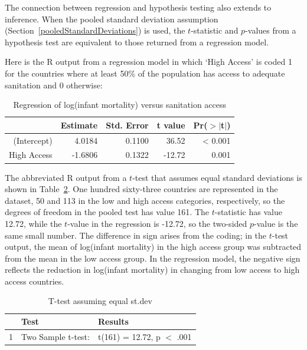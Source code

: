 The connection between regression and hypothesis testing also extends to inference. When the pooled standard deviation assumption (Section~\ref{pooledStandardDeviations}) is used, the $t$-statistic and $p$-values from a hypothesis test are equivalent to those returned from a regression model. 

Here is the \textsf{R} output from a regression model in which `High Access' is coded 1 for the countries where at least 50\% of the population has access to adequate sanitation and 0 otherwise:


\begin{table}[ht]
\centering
\begin{tabular}{rrrrr}
  \hline
 & Estimate & Std. Error & t value & Pr($>$$|$t$|$) \\ 
  \hline
(Intercept) & 4.0184 & 0.1100 & 36.52 & < 0.001 \\ 
  High Access & -1.6806 & 0.1322 & -12.72 & 0.001 \\ 
   \hline
\end{tabular}
\caption{Regression of log(infant mortality) versus sanitation access} 
\label{regressLogInfMortAccess}
\end{table}



The abbreviated \textsf{R} output from a $t$-test that assumes equal standard deviations is shown in Table~\ref{tTestSanitEqualStd}.  One hundred sixty-three countries are represented in the dataset, 50 and 113 in the low and high access categories, respectively,  so the degrees of freedom in the pooled test has value 161.  The $t$-statistic has value 12.72, while the $t$-value in the regression is -12.72, so the two-sided $p$-value is the same small number.   The difference in sign arises from the coding; in the $t$-test output, the mean of log(infant mortality) in the high access group was subtracted from the mean in the low access group.  In the regression model, the negative sign reflects the reduction in log(infant mortality) in changing from low access to high access countries.


\begin{table}[ht]
\centering
\begin{tabular}{rll}
  \hline
 & Test & Results \\ 
  \hline
1 &  Two Sample t-test: & t(161) = 12.72, p $<$ .001 \\ 
   \hline
\end{tabular}
\caption{T-test assuming equal st.dev} 
\label{tTestSanitEqualStd}
\end{table}


